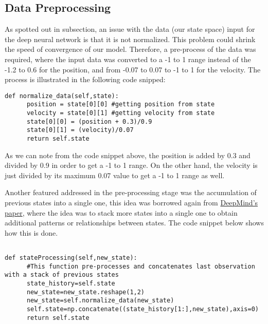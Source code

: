 \subsection{Data Preprocessing}
As spotted out in subsection, an issue with the data (our state space) input for the deep neural network is that it is not normalized. This problem could shrink the speed of convergence of our model. Therefore, a pre-process of the data was required, where the input data was converted to a -1 to 1 range instead of the -1.2 to 0.6 for the position, and from -0.07 to 0.07 to -1 to 1 for the velocity. The process is illustrated in the following code snipped: 

\begin{lstlisting}
def normalize_data(self,state):
      position = state[0][0] #getting position from state
      velocity = state[0][1] #getting velocity from state
      state[0][0] = (position + 0.3)/0.9
      state[0][1] = (velocity)/0.07
      return self.state
\end{lstlisting}

As we can note from the code snippet above, the position is added by 0.3 and divided by 0.9 in order to get a -1 to 1 range. On the other hand, the velocity is just divided by its maximum 0.07 value to get a -1 to 1 range as well.

Another featured addressed in the pre-processing stage was the accumulation of previous states into a single one, this idea was borrowed again from \href{https://storage.googleapis.com/deepmind-media/dqn/DQNNaturePaper.pdf}{DeepMind's paper}, where the idea was to stack more states into a single one to obtain additional patterns or relationships between states. The code snippet below shows how this is done.
\begin{lstlisting}

def stateProcessing(self,new_state):
      #This function pre-processes and concatenates last observation with a stack of previous states
      state_history=self.state
      new_state=new_state.reshape(1,2)
      new_state=self.normalize_data(new_state)
      self.state=np.concatenate((state_history[1:],new_state),axis=0)
      return self.state
\end{lstlisting}

